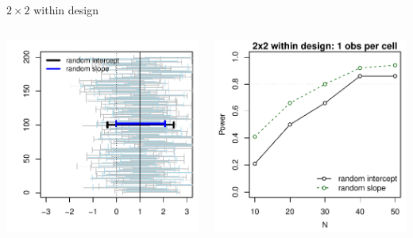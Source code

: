 \documentclass[aspectratio=169]{beamer}
\begin{document}
\begin{frame}{$2\times 2$ within design}
  \begin{columns}
    \begin{column}{.5\textwidth}
      \includegraphics[scale=.8]{../figures/nico_cis_2x2design_1obs}
    \end{column}
    \begin{column}{.5\textwidth}
      \includegraphics[scale=.8]{../figures/nico_power_2x2design_1obs}
    \end{column}
  \end{columns}
\end{frame}
\end{document}
